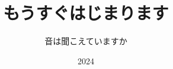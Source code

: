 \documentclass[aspectratio=169,xcolor={dvipsnames,table}]{beamer}
\title{もうすぐはじまります}
\subtitle{音は聞こえていますか}
\institute[]{}
\date[]{2024}
\institute{エデュオプちば}
\begin{document}
\begin{frame}[plain]
  \titlepage
\end{frame}
\end{document}
